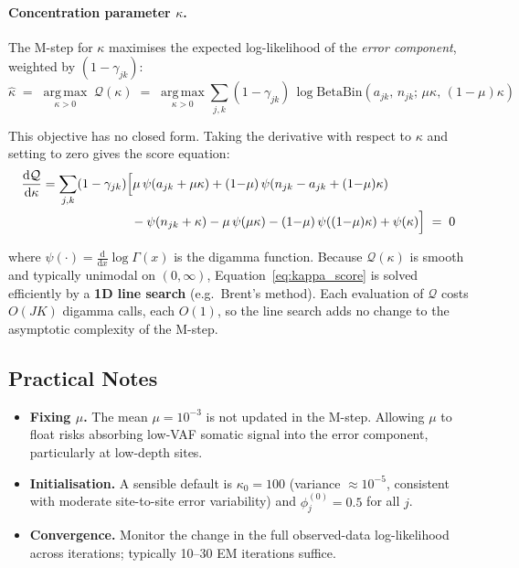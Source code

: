 \documentclass{article}
\begin{document}
\paragraph{Concentration parameter $\kappa$.}
The M-step for $\kappa$ maximises the expected log-likelihood of the
\emph{error component}, weighted by $(1 - \gamma_{jk})$:
\begin{equation}
  \hat{\kappa}
  \;=\;
  \operatorname*{arg\,max}_{\kappa > 0}
  \;\mathcal{Q}(\kappa)
  \;=\;
  \operatorname*{arg\,max}_{\kappa > 0}
  \sum_{j,k}
  (1 - \gamma_{jk})\,
  \log \mathrm{BetaBin}\!\left(a_{jk},\,n_{jk};\,\mu\kappa,\,(1{-}\mu)\kappa\right)
  \label{eq:mstep_kappa}
\end{equation}

This objective has no closed form.  Taking the derivative with respect to
$\kappa$ and setting to zero gives the score equation:
\begin{align}
  \frac{\mathrm{d}\mathcal{Q}}{\mathrm{d}\kappa}
  &= \sum_{j,k} (1 - \gamma_{jk})
  \Bigl[
    \mu\,\psi(a_{jk} + \mu\kappa)
    + (1{-}\mu)\,\psi(n_{jk} - a_{jk} + (1{-}\mu)\kappa) \notag \\
  &\qquad\qquad\qquad\quad
    - \psi(n_{jk} + \kappa)
    - \mu\,\psi(\mu\kappa)
    - (1{-}\mu)\,\psi((1{-}\mu)\kappa)
    + \psi(\kappa)
  \Bigr]
  \;=\; 0
  \label{eq:kappa_score}
\end{align}

where $\psi(\cdot) = \frac{\mathrm{d}}{\mathrm{d}x}\log\Gamma(x)$ is the
digamma function.  Because $\mathcal{Q}(\kappa)$ is smooth and typically
unimodal on $(0, \infty)$, Equation~\eqref{eq:kappa_score} is solved
efficiently by a \textbf{1D line search} (e.g.\ Brent's method).  Each evaluation of
$\mathcal{Q}$ costs $O(JK)$ digamma calls, each $O(1)$, so the line search
adds no change to the asymptotic complexity of the M-step.

\subsection*{Practical Notes}

\begin{itemize}
  \item \textbf{Fixing $\mu$.}  The mean $\mu = 10^{-3}$ is not updated in the
        M-step.  Allowing $\mu$ to float risks absorbing low-VAF somatic signal
        into the error component, particularly at low-depth sites.
  \item \textbf{Initialisation.}  A sensible default is $\kappa_0 = 100$
        (variance $\approx 10^{-5}$, consistent with moderate site-to-site
        error variability) and $\phi_j^{(0)} = 0.5$ for all $j$.
  \item \textbf{Convergence.}  Monitor the change in the full observed-data
        log-likelihood across iterations; typically 10--30 EM iterations
        suffice.
\end{itemize}
\end{document}
